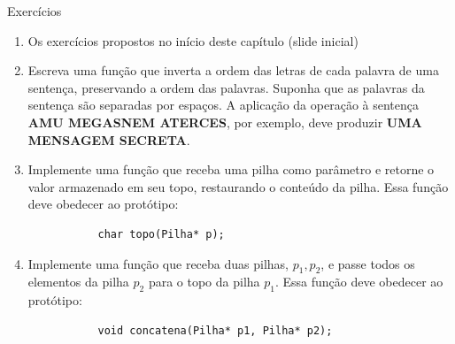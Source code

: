 %
\begin{frame}[fragile]{Exercícios}
	\begin{enumerate}
	
	\item Os exercícios propostos no início deste capítulo (slide inicial)
	
	
		\item Escreva uma função que inverta a ordem das letras de cada palavra de uma sentença, preservando a ordem das palavras. Suponha que as palavras da sentença são separadas por espaços. A aplicação da operação à sentença \textbf{AMU MEGASNEM ATERCES}, por exemplo, deve produzir \textbf{UMA MENSAGEM SECRETA}.
		\item Implemente uma função que receba uma pilha como parâmetro e retorne o valor armazenado em seu topo, restaurando o conteúdo da pilha. Essa função deve obedecer ao protótipo: 
		\begin{verbatim}
		   char topo(Pilha* p);
		\end{verbatim} 
		\item Implemente uma função que receba duas pilhas, $p_1, p_2$, e passe todos os elementos da pilha $p_2$ para o topo da pilha $p_1$. Essa função deve obedecer ao protótipo: 
		\begin{verbatim}
		   void concatena(Pilha* p1, Pilha* p2);
		\end{verbatim} 
	\end{enumerate}
\end{frame}
